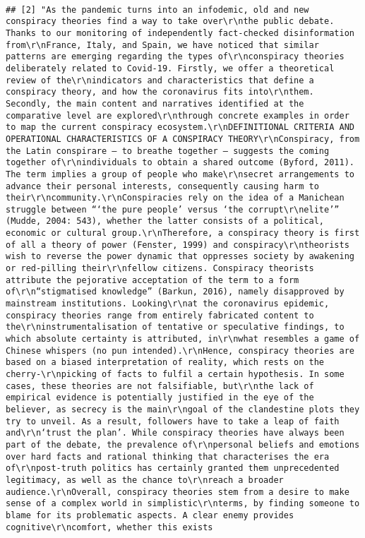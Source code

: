 \documentclass[
]{book}
\begin{document}
\begin{verbatim}
                                                                                                                                                                                                                                                                                                                                                                          
## [2] "As the pandemic turns into an infodemic, old and new conspiracy theories find a way to take over\r\nthe public debate. Thanks to our monitoring of independently fact-checked disinformation from\r\nFrance, Italy, and Spain, we have noticed that similar patterns are emerging regarding the types of\r\nconspiracy theories deliberately related to Covid-19. Firstly, we offer a theoretical review of the\r\nindicators and characteristics that define a conspiracy theory, and how the coronavirus fits into\r\nthem. Secondly, the main content and narratives identified at the comparative level are explored\r\nthrough concrete examples in order to map the current conspiracy ecosystem.\r\nDEFINITIONAL CRITERIA AND OPERATIONAL CHARACTERISTICS OF A CONSPIRACY THEORY\r\nConspiracy, from the Latin conspirare – to breathe together – suggests the coming together of\r\nindividuals to obtain a shared outcome (Byford, 2011). The term implies a group of people who make\r\nsecret arrangements to advance their personal interests, consequently causing harm to their\r\ncommunity.\r\nConspiracies rely on the idea of a Manichean struggle between “‘the pure people’ versus ‘the corrupt\r\nelite’” (Mudde, 2004: 543), whether the latter consists of a political, economic or cultural group.\r\nTherefore, a conspiracy theory is first of all a theory of power (Fenster, 1999) and conspiracy\r\ntheorists wish to reverse the power dynamic that oppresses society by awakening or red-pilling their\r\nfellow citizens. Conspiracy theorists attribute the pejorative acceptation of the term to a form of\r\n“stigmatised knowledge” (Barkun, 2016), namely disapproved by mainstream institutions. Looking\r\nat the coronavirus epidemic, conspiracy theories range from entirely fabricated content to the\r\ninstrumentalisation of tentative or speculative findings, to which absolute certainty is attributed, in\r\nwhat resembles a game of Chinese whispers (no pun intended).\r\nHence, conspiracy theories are based on a biased interpretation of reality, which rests on the cherry-\r\npicking of facts to fulfil a certain hypothesis. In some cases, these theories are not falsifiable, but\r\nthe lack of empirical evidence is potentially justified in the eye of the believer, as secrecy is the main\r\ngoal of the clandestine plots they try to unveil. As a result, followers have to take a leap of faith and\r\n‘trust the plan’. While conspiracy theories have always been part of the debate, the prevalence of\r\npersonal beliefs and emotions over hard facts and rational thinking that characterises the era of\r\npost-truth politics has certainly granted them unprecedented legitimacy, as well as the chance to\r\nreach a broader audience.\r\nOverall, conspiracy theories stem from a desire to make sense of a complex world in simplistic\r\nterms, by finding someone to blame for its problematic aspects. A clear enemy provides cognitive\r\ncomfort, whether this exists 
\end{verbatim}
\end{document}
